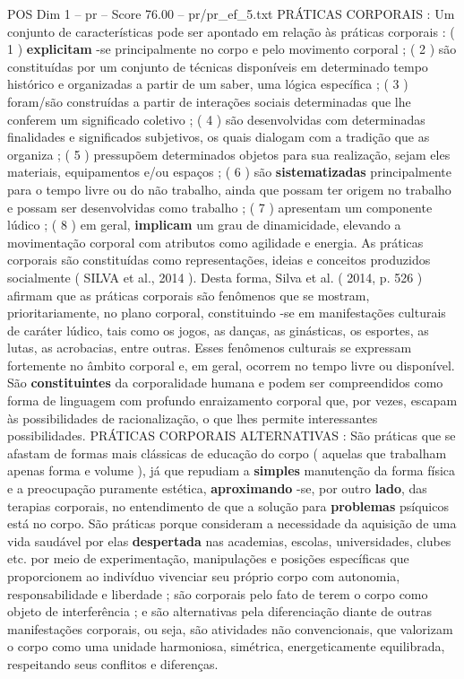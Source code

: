 \begin{textsample}{POS Dim 1 – pr – Score 76.00 – pr/pr\_ef\_5.txt}
PRÁTICAS CORPORAIS : Um conjunto de características pode ser apontado em relação às práticas corporais : ( 1 ) \textbf{explicitam} -se principalmente no corpo e pelo movimento corporal ; ( 2 ) são constituídas por um conjunto de técnicas disponíveis em determinado tempo histórico e organizadas a partir de um saber, uma lógica específica ; ( 3 ) foram/são construídas a partir de interações sociais determinadas que lhe conferem um significado coletivo ; ( 4 ) são desenvolvidas com determinadas finalidades e significados subjetivos, os quais dialogam com a tradição que as organiza ; ( 5 ) pressupõem determinados objetos para sua realização, sejam eles materiais, equipamentos e/ou espaços ; ( 6 ) são \textbf{sistematizadas} principalmente para o tempo livre ou do não trabalho, ainda que possam ter origem no trabalho e possam ser desenvolvidas como trabalho ; ( 7 ) apresentam um componente lúdico ; ( 8 ) em geral, \textbf{implicam} um grau de dinamicidade, elevando a movimentação corporal com atributos como agilidade e energia.
As práticas corporais são constituídas como representações, ideias e conceitos produzidos socialmente ( SILVA et al., 2014 ).
Desta forma, Silva et al. ( 2014, p. 526 ) afirmam que as práticas corporais são fenômenos que se mostram, prioritariamente, no plano corporal, constituindo -se em manifestações culturais de caráter lúdico, tais como os jogos, as danças, as ginásticas, os esportes, as lutas, as acrobacias, entre outras.
Esses fenômenos culturais se expressam fortemente no âmbito corporal e, em geral, ocorrem no tempo livre ou disponível.
São \textbf{constituintes} da corporalidade humana e podem ser compreendidos como forma de linguagem com profundo enraizamento corporal que, por vezes, escapam às possibilidades de racionalização, o que lhes permite interessantes possibilidades.
PRÁTICAS CORPORAIS ALTERNATIVAS : São práticas que se afastam de formas mais clássicas de educação do corpo ( aquelas que trabalham apenas forma e volume ), já que repudiam a \textbf{simples} manutenção da forma física e a preocupação puramente estética, \textbf{aproximando} -se, por outro \textbf{lado}, das terapias corporais, no entendimento de que a solução para \textbf{problemas} psíquicos está no corpo.
São práticas porque consideram a necessidade da aquisição de uma vida saudável por elas \textbf{despertada} nas academias, escolas, universidades, clubes etc. por meio de experimentação, manipulações e posições específicas que proporcionem ao indivíduo vivenciar seu próprio corpo com autonomia, responsabilidade e liberdade ; são corporais pelo fato de terem o corpo como objeto de interferência ; e são alternativas pela diferenciação diante de outras manifestações corporais, ou seja, são atividades não convencionais, que valorizam o corpo como uma unidade harmoniosa, simétrica, energeticamente equilibrada, respeitando seus conflitos e diferenças.

\end{textsample}
